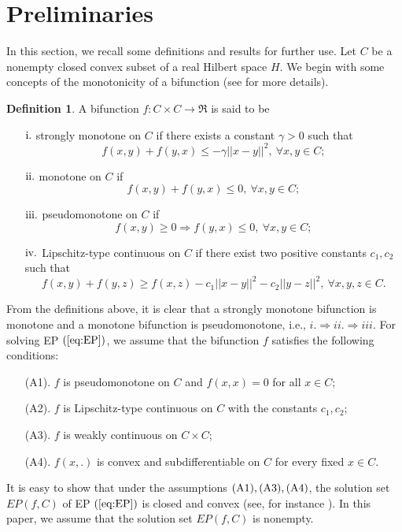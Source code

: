 \documentclass{aims}
\theoremstyle{definition}
\newtheorem{definition}[theorem]{Definition}
\begin{document}
\section{Preliminaries}\label{pre}
In this section, we recall some definitions and results for further use. Let $C$ be a nonempty closed convex subset of a real Hilbert space $H$. 
We begin with some concepts of the monotonicity of a bifunction (see \cite{BO1994,MO1992} for more details).
\begin{definition} A bifunction $f:C\times C\to \Re$ is said to be
\begin{itemize}
\item [$\rm i.$] strongly monotone on $C$ if there exists a constant $\gamma>0$ such that
$$ f(x,y)+f(y,x)\le -\gamma ||x-y||^2,~\forall x,y\in C; $$
\item [$\rm ii.$] monotone on $C$ if 
$$ f(x,y)+f(y,x)\le 0,~\forall x,y\in C; $$
\item [$\rm iii.$] pseudomonotone on $C$ if 
$$ f(x,y)\ge 0 \Longrightarrow f(y,x)\le 0,~\forall x,y\in C;$$
\item [$\rm iv.$] Lipschitz-type continuous on $C$ if there exist two positive constants $c_1,c_2$ such that
$$ f(x,y) + f(y,z) \geq f(x,z) - c_1||x-y||^2 - c_2||y-z||^2, ~ \forall x,y,z \in C.$$
\end{itemize}
\end{definition}
From the definitions above, it is clear that a strongly monotone bifunction is monotone and a monotone bifunction is pseudomonotone, i.e., 
$i.\Longrightarrow ii. \Longrightarrow iii.$ For solving EP $(\ref{eq:EP})$, we assume that the bifunction $f$ satisfies the following conditions:
\begin{itemize}
\item[(A1).] $f$ is pseudomonotone on $C$ and $f(x,x)=0$ for all $x\in C$;
\item [(A2).]  $f$ is Lipschitz-type continuous on $C$ with the constants $c_1,c_2$;
\item [(A3).]   $f$ is weakly continuous on $C\times C$;
\item [(A4).]  $f(x,.)$ is convex and subdifferentiable on $C$  for every fixed $x\in C.$
\end{itemize}  
It is easy to show that under the 
assumptions $\rm (A1), (A3),(A4)$, the solution set $EP(f,C)$ of EP $(\ref{eq:EP})$  is closed and convex 
(see, for instance \cite{QMH2008}). In this paper, we assume that the solution set $EP(f,C)$ is nonempty.
\end{document}
